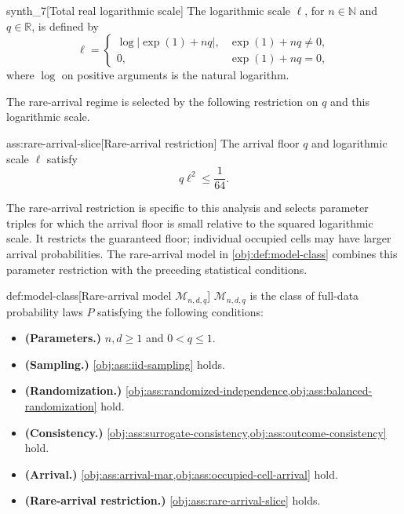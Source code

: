 \begin{definitionv}{synth_7}[Total real logarithmic scale]
The logarithmic scale \(\ell\), for \(n\in\mathbb N\) and \(q\in\mathbb R\), is defined by
\[
\ell=
\begin{cases}
\log\bigl|\exp(1)+nq\bigr|, & \exp(1)+nq\ne 0,\\
0, & \exp(1)+nq=0,
\end{cases}
\]
where \(\log\) on positive arguments is the natural logarithm.
\end{definitionv}

The rare-arrival regime is selected by the following restriction on \(q\) and this logarithmic scale.

\begin{assumptionv}{ass:rare-arrival-slice}[Rare-arrival restriction]
The arrival floor \(q\) and logarithmic scale \(\ell\) satisfy
\[
q\ell^2\le \frac{1}{64}.
\]
\end{assumptionv}

The rare-arrival restriction is specific to this analysis and selects parameter triples for which the arrival floor is small relative to the squared logarithmic scale. It restricts the guaranteed floor; individual occupied cells may have larger arrival probabilities. The rare-arrival model  in \cref{obj:def:model-class} combines this parameter restriction with the preceding statistical conditions.

\begin{definitionv}{def:model-class}[Rare-arrival model \(\mathcal M_{n,d,q}\)]
\(\mathcal M_{n,d,q}\) is the class of full-data probability laws \(P\) satisfying the following conditions:
\begin{itemize}
\item \textbf{(Parameters.)} \(n,d\ge1\) and \(0<q\le1\).
\item \textbf{(Sampling.)} \cref{obj:ass:iid-sampling} holds.
\item \textbf{(Randomization.)} \cref{obj:ass:randomized-independence,obj:ass:balanced-randomization} hold.
\item \textbf{(Consistency.)} \cref{obj:ass:surrogate-consistency,obj:ass:outcome-consistency} hold.
\item \textbf{(Arrival.)} \cref{obj:ass:arrival-mar,obj:ass:occupied-cell-arrival} hold.
\item \textbf{(Rare-arrival restriction.)} \cref{obj:ass:rare-arrival-slice} holds.
\end{itemize}
\end{definitionv}

